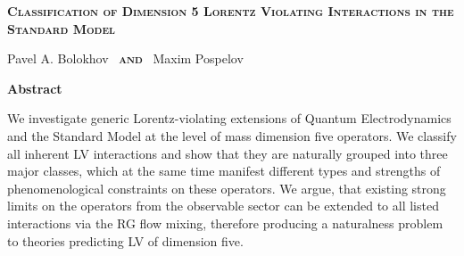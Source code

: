 \documentclass[12pt]{revtex4}
\begin{document}
\begin{titlepage}
\renewcommand{\thefootnote}{\fnsymbol{footnote}}

\vspace*{3.0cm}
\begin{center}
{\Large
  \textbf{
  \textsc{Classification of Dimension 5 Lorentz Violating Interactions 
		in the Standard Model}
         }
      }

\vspace*{1.0cm}
  {\large {}\selectfont Pavel A. Bolokhov~ 
	{\normalsize\bf \textsc{and}} ~Maxim Pospelov}

\vspace*{1.5cm}
{\large\bf Abstract}
\end{center}

	We investigate generic Lorentz-violating extensions of Quantum Electrodynamics and
	the Standard Model at the level of mass dimension five operators.
	We classify all inherent LV interactions and show that they
	are naturally grouped into three major classes,
	which at the same time manifest different types and strengths of phenomenological constraints
	on these operators.
	We argue, that existing strong limits on the operators from the observable sector
	can be extended to all listed interactions via the RG flow mixing, 
	therefore producing a naturalness problem to theories predicting LV of dimension five.
	
	


\end{titlepage}

\newpage

\tableofcontents

\newpage
\end{document}
